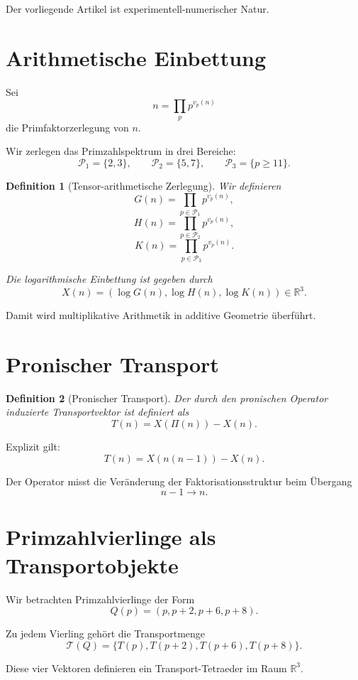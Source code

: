\documentclass[11pt,a4paper]{article}
\newtheorem{definition}{Definition}
\begin{document}
	Der vorliegende Artikel ist experimentell-numerischer Natur.
	
	\section{Arithmetische Einbettung}
	
	Sei
	\[
	n=\prod_p p^{v_p(n)}
	\]
	die Primfaktorzerlegung von \(n\).
	
	Wir zerlegen das Primzahlspektrum in drei Bereiche:
	\[
	\mathcal P_1=\{2,3\},
	\qquad
	\mathcal P_2=\{5,7\},
	\qquad
	\mathcal P_3=\{p\ge 11\}.
	\]
	
	\begin{definition}[Tensor-arithmetische Zerlegung]
		Wir definieren
		\[
		G(n)=\prod_{p\in\mathcal P_1} p^{v_p(n)},
		\]
		\[
		H(n)=\prod_{p\in\mathcal P_2} p^{v_p(n)},
		\]
		\[
		K(n)=\prod_{p\in\mathcal P_3} p^{v_p(n)}.
		\]
		
		Die logarithmische Einbettung ist gegeben durch
		\[
		X(n)=
		(
		\log G(n),
		\log H(n),
		\log K(n)
		)
		\in\mathbb R^3.
		\]
	\end{definition}
	
	Damit wird multiplikative Arithmetik in additive Geometrie überführt.
	
	\section{Pronischer Transport}
	
	\begin{definition}[Pronischer Transport]
		Der durch den pronischen Operator induzierte Transportvektor ist definiert als
		\[
		T(n)=X(\Pi(n))-X(n).
		\]
	\end{definition}
	
	Explizit gilt:
	\[
	T(n)=X(n(n-1))-X(n).
	\]
	
	Der Operator misst die Veränderung der Faktorisationsstruktur beim Übergang
	\[
	n-1 \to n.
	\]
	
	\section{Primzahlvierlinge als Transportobjekte}
	
	Wir betrachten Primzahlvierlinge der Form
	\[
	Q(p)=(p,p+2,p+6,p+8).
	\]
	
	Zu jedem Vierling gehört die Transportmenge
	\[
	\mathcal T(Q)
	=
	\{
	T(p),
	T(p+2),
	T(p+6),
	T(p+8)
	\}.
	\]
	
	Diese vier Vektoren definieren ein Transport-Tetraeder im Raum \(\mathbb R^3\).
	
\end{document}
